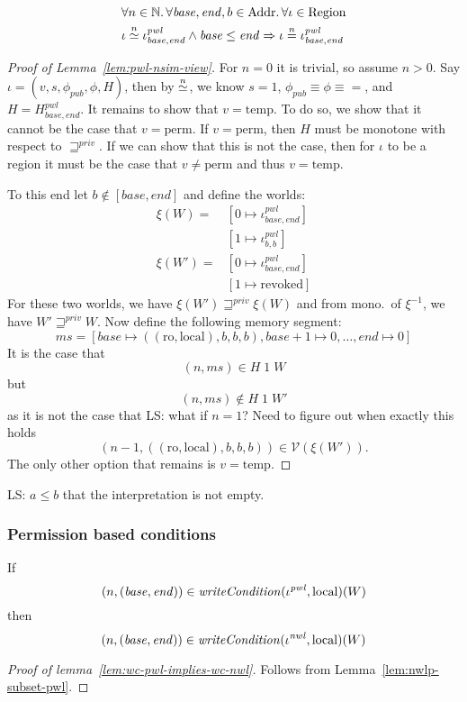 \documentclass[a4paper]{article}
\newcommand{\nequal}[1][n]{\stackrel{\tiny{#1}}{=}}
\renewcommand{\nsim}[1][n]{\stackrel{\tiny{#1}}{\simeq}}
\newcommand\lau[1]{{\color{purple} \sf \footnotesize {LS: #1}}\\}
\newcommand{\var}[1]{\mathit{#1}}
\newcommand{\hs}{\var{ms}}
\newcommand{\ms}{\hs}
\newcommand{\start}{\var{base}}
\newcommand{\addrend}{\var{end}}
\newcommand{\nwl}{\var{nwl}}
\newcommand{\pwl}{\var{pwl}}
\newcommand{\plainfun}[2]{
  \ifthenelse{\equal{#2}{}}
  {\mathit{#1}}
  {\mathit{#1}(#2)}
}
\newcommand{\writeCond}[1]{\plainfun{writeCondition}{#1}}
\newcommand{\futurestr}{\mathbin{\sqsupseteq}^{\var{priv}}}
\newcommand{\asmType}{\plaindom{AsmType}}
\newcommand{\plaindom}[1]{\mathrm{#1}}
\newcommand{\Addrs}{\plaindom{Addr}}
\newcommand{\nats}{\mathbb{N}}
\newcommand{\Regions}{\plaindom{Region}}
\newcommand{\intr}[2]{\mathcal{#1}}
\newcommand{\valueintr}[1]{\intr{V}{#1}}
\newcommand{\stdvr}{\valueintr{\asmType}}
\newcommand{\npair}[2][n]{\left(#1,#2 \right)}
\newcommand{\plainperm}[1]{\mathrm{#1}}
\newcommand{\readonly}{\plainperm{ro}}
\newcommand{\local}{\plainperm{local}}
\newcommand{\plainview}[1]{\mathrm{#1}}
\newcommand{\perma}{\plainview{perm}}
\newcommand{\temp}{\plainview{temp}}
\newcommand{\revoked}{\plainview{revoked}}
\begin{document}
\begin{lemma}
  \label{lem:pwl-nsim-view}
  \begin{align*}
    & \forall n \in \nats \ldotp \forall \start, \addrend, b \in \Addrs \ldotp \forall \iota \in \Regions \\
    & \iota \nsim \iota^\pwl_{\start,\addrend} \land \start \leq \addrend \Rightarrow \iota \nequal \iota^\pwl_{\start,\addrend}
  \end{align*}
\end{lemma}
\begin{proof}[Proof of Lemma~\ref{lem:pwl-nsim-view}]
  For $n = 0$ it is trivial, so assume $n > 0$.
  Say $\iota = (v,s,\phi_{\var{pub}},\phi,H)$, then by $\nsim$, we know $s = 1$, $\phi_{\var{pub}} \equiv \phi \equiv =$, and $H = H^\pwl_{\start,\addrend}$. It remains to show that $v=\temp$. To do so, we show that it cannot be the case that $v=\perma$. If $v = \perma$, then $H$ must be monotone with respect to $\futurestr$. If we can show that this is not the case, then for $\iota$ to be a region it must be the case that $v \neq \perma$ and thus $v = \temp$.

  To this end let $b\not\in[\start,\addrend]$ and define the worlds:
  \begin{align*}
    \xi (W)  =& [0 \mapsto \iota^\pwl_{\start,\addrend}]  \\ 
              & [1 \mapsto \iota^\pwl_{b,b}] \\
    \xi (W')  =& [0 \mapsto \iota^\pwl_{\start,\addrend}]  \\ 
              & [1 \mapsto \revoked] 
  \end{align*}
  For these two worlds, we have $\xi(W') \futurestr \xi(W)$ and from mono.\ of $\xi^{-1}$, we have $W' \futurestr W$. Now define the following memory segment:
  \[
    \ms = [\start \mapsto ((\readonly,\local),b,b,b), \start+1 \mapsto 0, \dots , \addrend \mapsto 0]
  \]
  It is the case that
  \[
    \npair{\ms} \in H \; 1 \; W
  \]
  but
  \[
    \npair{\ms} \not\in H \; 1 \; W'
  \]
  as it is not the case that \lau{what if $n=1$? Need to figure out when exactly this holds}
  \[
    \npair[n-1]{((\readonly,\local),b,b,b)} \in \stdvr(\xi(W')).
  \]
  The only other option that remains is $v=\temp$.
\end{proof}
\lau{$a \leq b$ that the interpretation is not empty.}

\subsubsection{Permission based conditions}
\begin{lemma}
  \label{lem:wc-pwl-implies-wc-nwl}
  If
  \[
    \npair{(\start,\addrend)} \in \writeCond{}(\iota^\pwl,\local)(W)
  \]
  then
  \[
    \npair{(\start,\addrend)} \in \writeCond{}(\iota^\nwl,\local)(W)
  \]
\end{lemma}
\begin{proof}[Proof of lemma~\ref{lem:wc-pwl-implies-wc-nwl}]
  Follows from Lemma~\ref{lem:nwlp-subset-pwl}.
\end{proof}
\end{document}
